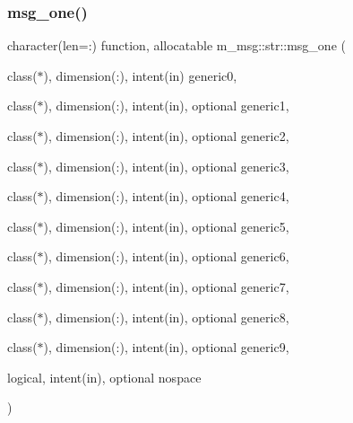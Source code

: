 \subsubsection{\texorpdfstring{msg\+\_\+one()}{msg\_one()}}
{\footnotesize\ttfamily character(len=\+:) function, allocatable m\+\_\+msg\+::str\+::msg\+\_\+one (\begin{DoxyParamCaption}\item[{class($\ast$), dimension(\+:), intent(in)}]{generic0,  }\item[{class($\ast$), dimension(\+:), intent(in), optional}]{generic1,  }\item[{class($\ast$), dimension(\+:), intent(in), optional}]{generic2,  }\item[{class($\ast$), dimension(\+:), intent(in), optional}]{generic3,  }\item[{class($\ast$), dimension(\+:), intent(in), optional}]{generic4,  }\item[{class($\ast$), dimension(\+:), intent(in), optional}]{generic5,  }\item[{class($\ast$), dimension(\+:), intent(in), optional}]{generic6,  }\item[{class($\ast$), dimension(\+:), intent(in), optional}]{generic7,  }\item[{class($\ast$), dimension(\+:), intent(in), optional}]{generic8,  }\item[{class($\ast$), dimension(\+:), intent(in), optional}]{generic9,  }\item[{logical, intent(in), optional}]{nospace }\end{DoxyParamCaption})\hspace{0.3cm}{\ttfamily [private]}}

\mbox{\label{interfacem__msg_1_1str_a753291c72286c8c2178b9946b3318555}} 
